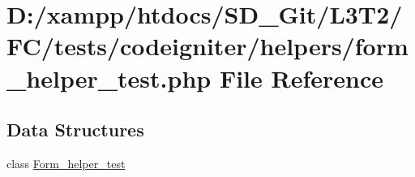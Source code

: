\hypertarget{form__helper__test_8php}{}\section{D\+:/xampp/htdocs/\+S\+D\+\_\+\+Git/\+L3\+T2/\+F\+C/tests/codeigniter/helpers/form\+\_\+helper\+\_\+test.php File Reference}
\label{form__helper__test_8php}
\subsection*{Data Structures}
\begin{DoxyCompactItemize}
\item 
class \hyperlink{class_form__helper__test}{Form\+\_\+helper\+\_\+test}
\end{DoxyCompactItemize}
